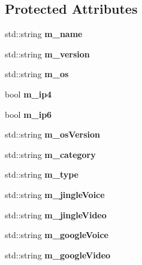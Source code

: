 \subsection*{Protected Attributes}
\begin{DoxyCompactItemize}
\item 
\hypertarget{classSwVersion_a6c0441595023a2153b4f3be00ceb84f1}{
std::string {\bfseries m\_\-name}}
\label{classSwVersion_a6c0441595023a2153b4f3be00ceb84f1}

\item 
\hypertarget{classSwVersion_a4927320cd603c1712ef34306624dbabc}{
std::string {\bfseries m\_\-version}}
\label{classSwVersion_a4927320cd603c1712ef34306624dbabc}

\item 
\hypertarget{classSwVersion_ad24e64f4e43dde2c0f20651cecc5d8bc}{
std::string {\bfseries m\_\-os}}
\label{classSwVersion_ad24e64f4e43dde2c0f20651cecc5d8bc}

\item 
\hypertarget{classSwVersion_a06d2b95f61456f7cbb046dfd9be803dc}{
bool {\bfseries m\_\-ip4}}
\label{classSwVersion_a06d2b95f61456f7cbb046dfd9be803dc}

\item 
\hypertarget{classSwVersion_a46987ff1afa2d8865dc74ae7dc70d0a6}{
bool {\bfseries m\_\-ip6}}
\label{classSwVersion_a46987ff1afa2d8865dc74ae7dc70d0a6}

\item 
\hypertarget{classSwVersion_ab8eb88208537827255310041895c1bff}{
std::string {\bfseries m\_\-osVersion}}
\label{classSwVersion_ab8eb88208537827255310041895c1bff}

\item 
\hypertarget{classSwVersion_ad300c9b4720078a13cbab3e2fe3dc89d}{
std::string {\bfseries m\_\-category}}
\label{classSwVersion_ad300c9b4720078a13cbab3e2fe3dc89d}

\item 
\hypertarget{classSwVersion_aa64e05dd4ae4d995b3f2499eee1c8714}{
std::string {\bfseries m\_\-type}}
\label{classSwVersion_aa64e05dd4ae4d995b3f2499eee1c8714}

\item 
\hypertarget{classSwVersion_a33aa3d27d2ebba203f4a8b0eda55e7e1}{
std::string {\bfseries m\_\-jingleVoice}}
\label{classSwVersion_a33aa3d27d2ebba203f4a8b0eda55e7e1}

\item 
\hypertarget{classSwVersion_a0cc216d1e01ac5820bb55ae944b3601d}{
std::string {\bfseries m\_\-jingleVideo}}
\label{classSwVersion_a0cc216d1e01ac5820bb55ae944b3601d}

\item 
\hypertarget{classSwVersion_a7f3a443fc7cd9a05693517328f988e02}{
std::string {\bfseries m\_\-googleVoice}}
\label{classSwVersion_a7f3a443fc7cd9a05693517328f988e02}

\item 
\hypertarget{classSwVersion_a0deacb11ae434c5c53b80ddbafe5a77e}{
std::string {\bfseries m\_\-googleVideo}}
\label{classSwVersion_a0deacb11ae434c5c53b80ddbafe5a77e}

\end{DoxyCompactItemize}



